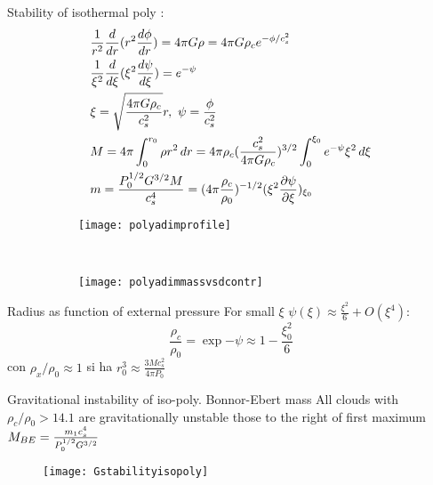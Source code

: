 \begin{frame}{Stability of isothermal poly}
:
\begin{align*}
&\frac{1}{r^2}\frac{d}{d r}(r^2\frac{d \phi}{d r})=4\pi G\rho=4\pi G\rho_ce^{-\phi/c_s^2}\\
&\frac{1}{\xi^2}\frac{d}{d \xi}(\xi^2\frac{d \psi}{d \xi})=e^{-\psi}\\
&\xi=\sqrt{\frac{4\pi G\rho_c}{c_s^2}}r,\ \psi=\frac{\phi}{c_s^2}\\
&M=4\pi\int_0^{r_0}\rho r^2\,dr=4\pi\rho_c(\frac{c_s^2}{4\pi G\rho_c})^{3/2}\int_0^{\xi_0}e^{-\psi}\xi^2\,d\xi\\
&m=\frac{P_0^{1/2}G^{3/2}M}{c_s^4}=(4\pi\frac{\rho_c}{\rho_0})^{-1/2}(\xi^2\frac{\partial \psi}{\partial \xi})_{\xi_0}
\end{align*}

\begin{figure}[!ht]
\begin{subfigure}[b]{0.47\textwidth}
\centering
\texttt{[image: polyadimprofile]}\label{fig:polyadimprofile} \end{subfigure}
~
\begin{subfigure}[b]{0.47\textwidth} \centering
\texttt{[image: polyadimmassvsdcontr]}\label{fig:polyadimmassvsdcontr}
\end{subfigure} \end{figure} 


\begin{wordonframe}{Radius as function of external pressure}
For small $\xi$ $\psi(\xi)\approx\frac{\xi^2}{6}+O(\xi^4)$:
\begin{equation*}
\frac{\rho_c}{\rho_0}=\exp{-\psi}\approx1-\frac{\xi_0^2}{6}
\end{equation*}
con $\rho_x/\rho_0\approx1$ si ha $r_0^3\approx\frac{3Mc_s^2}{4\pi P_0}$
\end{wordonframe}

\begin{frame}{Gravitational instability of iso-poly. Bonnor-Ebert mass}
All clouds with $\rho_c/\rho_0>14.1$ are gravitationally unstable those to the right of first maximum $M_{BE}=\frac{m_1c_s^4}{P_0^{1/2}G^{3/2}}$
\begin{figure}[!ht]\texttt{[image: Gstabilityisopoly]}\label{fig:Gstabilityisopoly}\end{figure}
\end{frame}


\end{frame}
